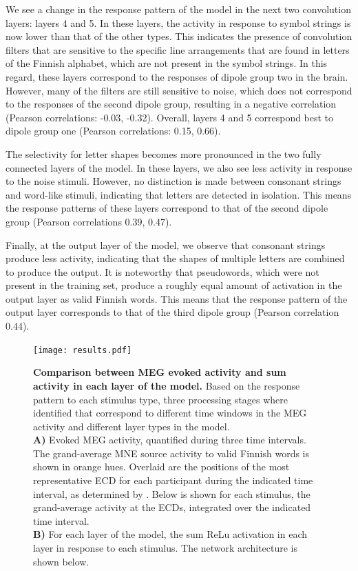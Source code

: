 \documentclass[a4paper, 10pt]{vanvliet_paper}
\begin{document}
We see a change in the response pattern of the model in the next two convolution layers: layers 4 and 5.
In these layers, the activity in response to symbol strings is now lower than that of the other types.
This indicates the presence of convolution filters that are sensitive to the specific line arrangements that are found in letters of the Finnish alphabet, which are not present in the symbol strings.
In this regard, these layers correspond to the responses of dipole group two in the brain.
However, many of the filters are still sensitive to noise, which does not correspond to the responses of the second dipole group, resulting in a negative correlation (Pearson correlations: -0.03, -0.32).
Overall, layers 4 and 5 correspond best to dipole group one (Pearson correlations: 0.15, 0.66).

The selectivity for letter shapes becomes more pronounced in the two fully connected layers of the model.
In these layers, we also see less activity in response to the noise stimuli.
However, no distinction is made between consonant strings and word-like stimuli, indicating that letters are detected in isolation.
This means the response patterns of these layers correspond to that of the second dipole group (Pearson correlations 0.39, 0.47).

Finally, at the output layer of the model, we observe that consonant strings produce less activity, indicating that the shapes of multiple letters are combined to produce the output.
It is noteworthy that pseudowords, which were not present in the training set, produce a roughly equal amount of activation in the output layer as valid Finnish words.
This means that the response pattern of the output layer corresponds to that of the third dipole group (Pearson correlation 0.44).

\begin{figure}
    \texttt{[image: results.pdf]}
    \vspace{2ex}
    \caption{
        \textbf{Comparison between \gls{MEG} evoked activity and sum activity in each layer of the model.}
        Based on the response pattern to each stimulus type, three processing stages where identified that correspond to different time windows in the \gls{MEG} activity and different layer types in the model.\\
        \textbf{A)} Evoked \gls{MEG} activity, quantified during three time intervals.
        The grand-average \gls{MNE} source activity to valid Finnish words is shown in orange hues.
        Overlaid are the positions of the most representative \gls{ECD} for each participant during the indicated time interval, as determined by \textcite{Vartiainen2011}.
        Below is shown for each stimulus, the grand-average activity at the \glspl{ECD}, integrated over the indicated time interval.\\
        \textbf{B)} For each layer of the model, the sum \gls{ReLu} activation in each layer in response to each stimulus.
        The network architecture is shown below.
    }\label{fig:results}
\end{figure}
\end{document}
